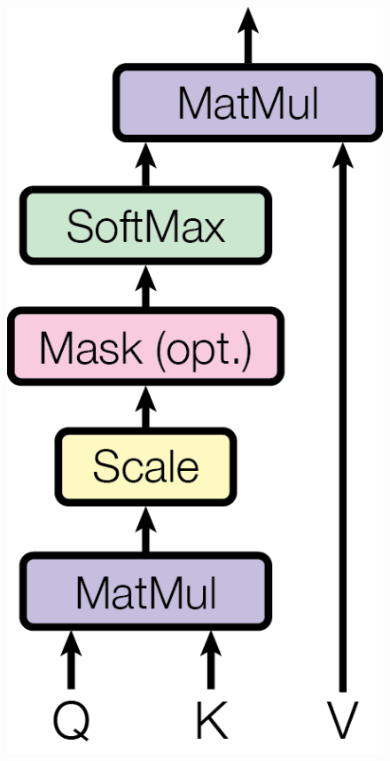 \documentclass[]{beamer}
\begin{document}
\begin{frame}
\begin{columns}
\begin{column}[]{0.5\textwidth}
\begin{figure}[r]
                \includegraphics[scale = 0.6]{ModalNet-19.png}
            \end{figure}
        \end{column}
    \end{columns}    
\end{frame}
\end{document}

